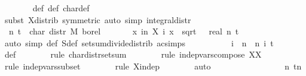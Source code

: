 {\ \ \ \ \ \ \isamarkupfalse%
\ {\isasympsi}{\isacharunderscore}def\ {\isasympsi}{\isacharprime}{\isacharunderscore}def\ char{\isacharunderscore}def\isanewline
\ \ \ \ \ \ \isamarkupfalse%
\ {\isacharparenleft}subst\ X{\isacharunderscore}distrib\ {\isacharbrackleft}symmetric{\isacharbrackright}{\isacharparenright}\ {\isacharparenleft}auto\ simp{\isacharcolon}\ integral{\isacharunderscore}distr{\isacharparenright}\isanewline
\isanewline
\ \ \ \ \isamarkupfalse%
\ {\isachardoublequoteopen}{\isasymphi}\ n\ t\ {\isacharequal}\ char\ {\isacharparenleft}distr\ M\ borel\isanewline
\ \ \ \ \ \ \ {\isacharparenleft}{\isasymlambda}x{\isachardot}\ {\isasymSum}i{\isacharless}n{\isachardot}\ X\ i\ x\ {\isacharslash}\ sqrt\ {\isacharparenleft}{\isasymsigma}\ {\isacharasterisk}\ real\ n{\isacharparenright}{\isacharparenright}{\isacharparenright}\ t{\isachardoublequoteclose}\isanewline
\ \ \ \ \ \ \isamarkupfalse%
\ {\isacharparenleft}auto\ simp{\isacharcolon}\ {\isasymphi}{\isacharunderscore}def\ S{\isacharunderscore}def\ setsum{\isacharunderscore}divide{\isacharunderscore}distrib\ ac{\isacharunderscore}simps{\isacharparenright}\isanewline
\ \ \ \ \isamarkupfalse%
\ \isamarkupfalse%
\ {\isachardoublequoteopen}{\isasymdots}\ {\isacharequal}\ {\isacharparenleft}{\isasymProd}\ i\ {\isacharless}\ n{\isachardot}\ {\isasympsi}{\isacharprime}\ n\ i\ t{\isacharparenright}{\isachardoublequoteclose}\isanewline
\ \ \ \ \ \ \isamarkupfalse%
\ {\isasympsi}{\isacharprime}{\isacharunderscore}def\isanewline
\ \ \ \ \ \ \isamarkupfalse%
\ {\isacharparenleft}rule\ char{\isacharunderscore}distr{\isacharunderscore}setsum{\isacharparenright}\isanewline
\ \ \ \ \ \ \isamarkupfalse%
\ {\isacharparenleft}rule\ indep{\isacharunderscore}vars{\isacharunderscore}compose{}{\isacharbrackleft}\ X{\isacharequal}X{\isacharbrackright}{\isacharparenright}\isanewline
\ \ \ \ \ \ \isamarkupfalse%
\ {\isacharparenleft}rule\ indep{\isacharunderscore}vars{\isacharunderscore}subset{\isacharparenright}\isanewline
\ \ \ \ \ \ \isamarkupfalse%
\ {\isacharparenleft}rule\ X{\isacharunderscore}indep{\isacharparenright}\isanewline
\ \ \ \ \ \ \isamarkupfalse%
\ auto\isanewline
\ \ \ \ \ \ \isamarkupfalse%
\isanewline
\ \ \ \ \isamarkupfalse%
\ \isamarkupfalse%
\ {\isachardoublequoteopen}{\isasymdots}\ {\isacharequal}\ {\isacharparenleft}{\isasympsi}\ n\ t{\isacharparenright}{\isacharcircum}n{\isachardoublequoteclose}\isanewline
}
